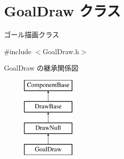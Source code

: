 \hypertarget{class_goal_draw}{}\section{Goal\+Draw クラス}
\label{class_goal_draw}


ゴール描画クラス  




{\ttfamily \#include $<$Goal\+Draw.\+h$>$}

Goal\+Draw の継承関係図\begin{figure}[H]
\begin{center}
\leavevmode
\includegraphics[height=4.000000cm]{class_goal_draw}
\end{center}
\end{figure}
